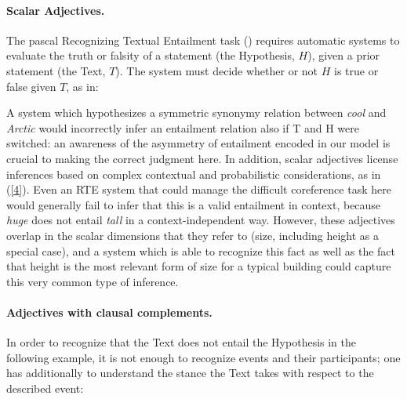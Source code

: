 \documentclass[10pt]{article}
\begin{document}
\paragraph{Scalar Adjectives.} The {\sc pascal} Recognizing Textual Entailment task (\cite{rte,dagan+glickman+magnini:2005}) requires automatic systems to evaluate the truth or falsity of a 
statement (the Hypothesis, $H$), given a prior statement (the Text, $T$). The system must decide whether or not $H$ is true or false given $T$, as in:
 \vspace{-.1in}


 \vspace{-.1in}
\noindent
A system which hypothesizes a symmetric synonymy relation between \emph{cool} and \emph{Arctic} would incorrectly infer an entailment relation also if T and H were switched: an awareness of the asymmetry of entailment encoded in our model is crucial to making the correct judgment here.
In addition, scalar adjectives license inferences based on complex contextual and probabilistic considerations, as in (\ref{4}).
 \vspace{-.1in}
 \vspace{-.1in}
Even an RTE system that could manage the difficult coreference task here would generally fail to infer that this is a valid entailment in context, because \emph{huge} does not entail \emph{tall} in a context-independent way. However, these adjectives overlap in the scalar dimensions that they refer to (size, including height as a special case), and a system which is able to recognize this fact as well as the fact that height is the most relevant form of size for a typical building could capture this very common type of inference. 

 \vspace{-.15in}
\paragraph{Adjectives with clausal complements.}  In order to recognize that the Text does not entail the Hypothesis in the following example, it is not enough to recognize events and their participants;  one has additionally to understand the stance the Text takes with respect to the described event:
\end{document}
